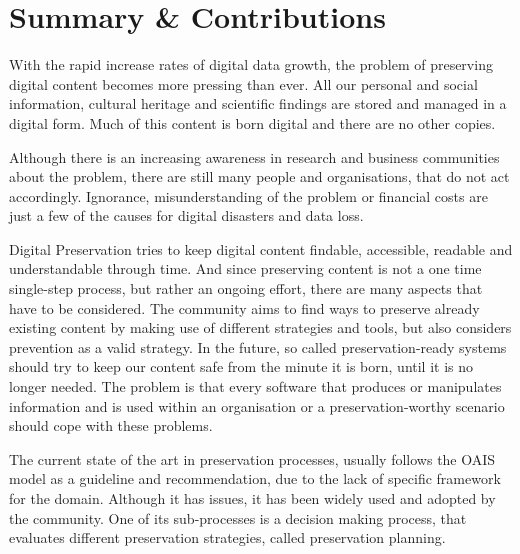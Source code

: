 \section{Summary \& Contributions}
With the rapid increase rates of digital data growth, the problem of preserving digital content becomes more pressing than ever.
All our personal and social information, cultural heritage and scientific findings are stored and managed in a digital form.
Much of this content is born digital and there are no other copies.

Although there is an increasing awareness in research and business communities about the problem, there are still many people and organisations, that do not act accordingly.
Ignorance, misunderstanding of the problem or financial costs are just a few of the causes for digital disasters and data loss.

Digital Preservation tries to keep digital content findable, accessible, readable and understandable through time.
And since preserving content is not a one time single-step process, but rather an ongoing effort, there are many aspects that have to be considered.
The community aims to find ways to preserve already existing content by making use of different strategies and tools, but also considers prevention as a valid strategy.
In the future, so called preservation-ready systems should try to keep our content safe from the minute it is born, until it is no longer needed. The problem is that every software that produces or manipulates information and is used within an organisation or a preservation-worthy scenario should cope with these problems.

The current state of the art in preservation processes, usually follows the OAIS model as a guideline and recommendation, due to the lack of specific framework for the domain.
Although it has issues, it has been widely used and adopted by the community.
One of its sub-processes is a decision making process, that evaluates different preservation strategies, called preservation planning.

